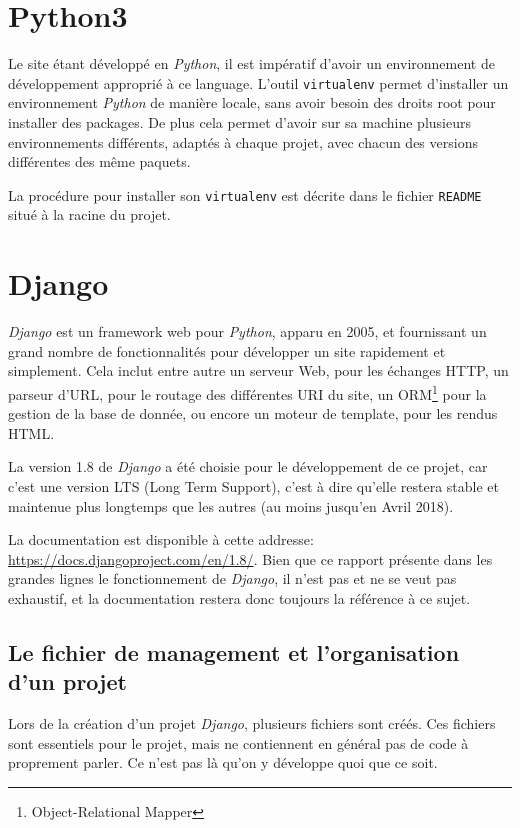 \documentclass[a4paper]{report}
\begin{document}
\section{Python3}
\label{sec:python3}
\par Le site étant développé en \emph{Python}, il est impératif d'avoir un environnement de développement approprié à ce
language. L'outil \verb#virtualenv# permet d'installer un environnement \emph{Python} de manière locale, sans avoir besoin des
droits root pour installer des packages. De plus cela permet d'avoir sur sa machine plusieurs environnements différents,
adaptés à chaque projet, avec chacun des versions différentes des même paquets.
\par La procédure pour installer son \verb#virtualenv# est décrite dans le fichier \verb#README# situé à la racine du
projet.

\section{Django}
\label{sec:django}
\par \emph{Django}  est un framework web pour \emph{Python}, apparu en 2005, et fournissant un grand nombre de fonctionnalités pour
développer un site rapidement et simplement. Cela inclut entre autre un serveur Web, pour les échanges HTTP, un parseur
d'URL, pour le routage des différentes URI du site, un ORM\footnote{Object-Relational Mapper} pour la gestion de la base
de donnée, ou encore un moteur de template, pour les rendus HTML.
\par La version 1.8 de \emph{Django} a été choisie pour le développement de ce projet, car c'est une version LTS (Long Term
Support), c'est à dire qu'elle restera stable et maintenue plus longtemps que les autres (au moins jusqu'en Avril 2018).
\par La documentation est disponible à cette addresse: \url{https://docs.djangoproject.com/en/1.8/}. Bien que ce rapport
présente dans les grandes lignes le fonctionnement de \emph{Django}, il n'est pas et ne se veut pas exhaustif, et la
documentation restera donc toujours la référence à ce sujet.

\subsection{Le fichier de management et l'organisation d'un projet}
\label{sub:Le fichier de management et l'organisation d'un projet}

\par Lors de la création d'un projet \emph{Django}, plusieurs fichiers sont créés. Ces fichiers sont essentiels pour le projet,
mais ne contiennent en général pas de code à proprement parler. Ce n'est pas là qu'on y développe quoi que ce soit.
\end{document}

